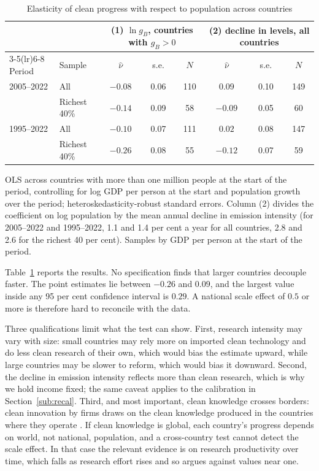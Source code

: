\documentclass[11pt]{article}
\begin{document}
\begin{table}[h!]\centering
\begin{threeparttable}
\caption{Elasticity of clean progress with respect to population across countries}
\label{tab:nu}
\footnotesize
\begin{tabular}{llcccccc}
\toprule
 & & \multicolumn{3}{c}{(1) $\ln g_{B}$, countries with $g_B>0$} & \multicolumn{3}{c}{(2) decline in levels, all countries}\\
\cmidrule(lr){3-5}\cmidrule(lr){6-8}
Period & Sample & $\hat\nu$ & s.e. & $N$ & $\hat\nu$ & s.e. & $N$\\
\midrule
2005--2022 & All          & $-0.08$ & 0.06 & 110 & $0.09$  & 0.10 & 149\\
           & Richest 40\% & $-0.14$ & 0.09 & 58  & $-0.09$ & 0.05 & 60\\
1995--2022 & All          & $-0.10$ & 0.07 & 111 & $0.02$  & 0.08 & 147\\
           & Richest 40\% & $-0.26$ & 0.08 & 55  & $-0.12$ & 0.07 & 59\\
\bottomrule
\end{tabular}
\begin{tablenotes}\footnotesize
\item OLS across countries with more than one million people at the start of the period, controlling for
log GDP per person at the start and population growth over the period; heteroskedasticity-robust standard
errors. Column (2) divides the coefficient on log population by the mean annual decline in emission
intensity (for 2005--2022 and 1995--2022, 1.1 and 1.4 per cent a year for all countries, 2.8 and 2.6 for the
richest 40 per cent). Samples by
GDP per person at the start of the period.
\end{tablenotes}
\end{threeparttable}
\end{table}

Table~\ref{tab:nu} reports the results. No specification finds that larger countries decouple faster.
The point estimates lie between $-0.26$ and $0.09$, and the largest value inside any 95 per cent
confidence interval is $0.29$. A national scale effect of $0.5$ or more is therefore hard to reconcile with
the data.

Three qualifications limit what the test can show. First, research intensity may vary with size: small
countries may rely more on imported clean technology and do less clean research of their own, which would
bias the estimate upward, while large countries may be slower to reform, which would bias it downward.
Second, the decline in emission intensity reflects more than clean research, which is why we hold income
fixed; the same caveat applies to the calibration in Section~\ref{sub:recal}. Third, and most important,
clean knowledge crosses borders: clean innovation by firms draws on the clean knowledge produced in
the countries where they operate \citep{aghion2016carbon}. If clean knowledge is global, each country's
progress depends on world, not national, population, and a cross-country test cannot detect the scale
effect. In that case the relevant evidence is on research productivity over time, which falls as research
effort rises \citep{jones1995,bloom2020} and so argues against values near one.
\end{document}
